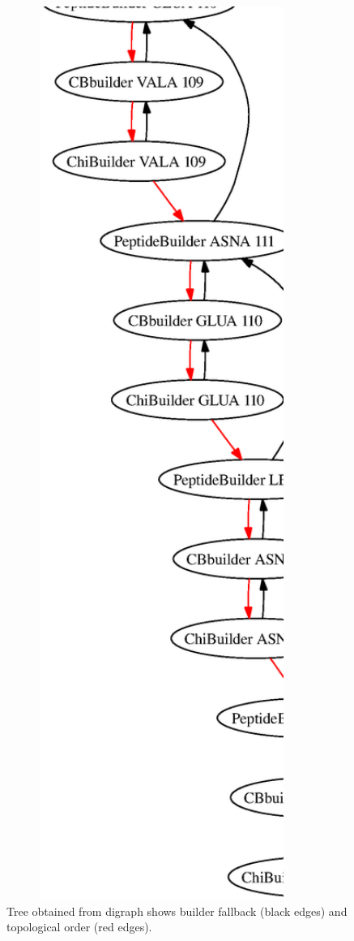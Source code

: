 \documentclass{article}[14pts]
\begin{document}
\begin{figure}
\includegraphics[width=4in]{tree.ps}
\caption{Tree obtained from digraph shows builder fallback (black edges) and topological order (red edges).}
\label{loop-tree}
\end{figure}
\end{document}
